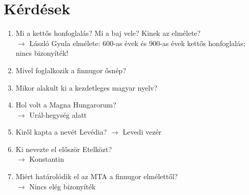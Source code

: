 \documentclass{article}
\begin{document}
\section{Kérdések}
\begin{enumerate}
    \item Mi a kettős honfoglalás? Mi a baj vele? Kinek az elmélete?\\
    $\rightarrow$ László Gyula elmélete: 600-as évek és 900-as évek kettős honfoglalás; nincs bizonyíték!
    \item Mivel foglalkozik a finnugor ősnép?

    \item Mikor alakult ki a kezdetleges magyar nyelv?
    
    \item Hol volt a Magna Hungarorum?\\
    $\rightarrow$ Urál-hegység alatt
    \item Kiről kapta a nevét Levédia?
    $\rightarrow$ Levedi vezér
    \item Ki nevezte el először Etelközt?\\
    $\rightarrow$ Konstantin
    \item Miért határolódik el az MTA a finnugor elmélettől?\\
    $\rightarrow$ Nincs elég bizonyíték
\end{enumerate}
\end{document}
